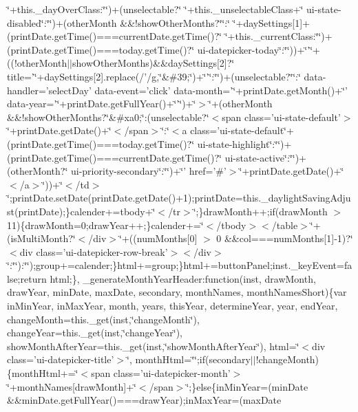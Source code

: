 {{\begin{DoxyParamCaption}
\char`\"{}+this.\+\_\+day\+Over\+Class\+:\char`\"{}\char`\"{})+(unselectable?\char`\"{} \char`\"{}+this.\+\_\+unselectable\+Class+\char`\"{} ui-\/state-\/disabled\char`\"{}\+:\char`\"{}\char`\"{})+(other\+Month \&\&!show\+Other\+Months?\char`\"{}\char`\"{}\+:\char`\"{} \char`\"{}+day\+Settings\mbox{[}1\mbox{]}+(print\+Date.\+get\+Time()===current\+Date.\+get\+Time()?\char`\"{} \char`\"{}+this.\+\_\+current\+Class\+:\char`\"{}\char`\"{})+(print\+Date.\+get\+Time()===today.\+get\+Time()?\char`\"{} ui-\/datepicker-\/today\char`\"{}\+:\char`\"{}\char`\"{}))+\char`\"{}'\char`\"{}+((!other\+Month$\vert$$\vert$show\+Other\+Months)\&\&day\+Settings\mbox{[}2\mbox{]}?\char`\"{} title='\char`\"{}+day\+Settings\mbox{[}2\mbox{]}.\+replace(/'/g,\char`\"{}\&\#39;\char`\"{})+\char`\"{}'\char`\"{}\+:\char`\"{}\char`\"{})+(unselectable?\char`\"{}\char`\"{}\+:\char`\"{} data-\/handler='select\+Day' data-\/event='click' data-\/month='\char`\"{}+print\+Date.\+get\+Month()+\char`\"{}' data-\/year='\char`\"{}+print\+Date.\+get\+Full\+Year()+\char`\"{}'\char`\"{})+\char`\"{}$>$\char`\"{}+(other\+Month \&\&!show\+Other\+Months?\char`\"{}\&\#xa0;\char`\"{}\+:(unselectable?\char`\"{}$<$span class='ui-\/state-\/default'$>$\char`\"{}+print\+Date.\+get\+Date()+\char`\"{}$<$/span$>$\char`\"{}\+:\char`\"{}$<$a class='ui-\/state-\/default\char`\"{}+(print\+Date.\+get\+Time()===today.\+get\+Time()?\char`\"{} ui-\/state-\/highlight\char`\"{}\+:\char`\"{}\char`\"{})+(print\+Date.\+get\+Time()===current\+Date.\+get\+Time()?\char`\"{} ui-\/state-\/active\char`\"{}\+:\char`\"{}\char`\"{})+(other\+Month?\char`\"{} ui-\/priority-\/secondary\char`\"{}\+:\char`\"{}\char`\"{})+\char`\"{}' href='\#'$>$\char`\"{}+print\+Date.\+get\+Date()+\char`\"{}$<$/a$>$\char`\"{}))+\char`\"{}$<$/td$>$\char`\"{};print\+Date.\+set\+Date(print\+Date.\+get\+Date()+1);print\+Date=this.\+\_\+daylight\+Saving\+Adjust(print\+Date);\}calender+=tbody+\char`\"{}$<$/tr$>$\char`\"{};\}draw\+Month++;if(draw\+Month $>$ 11)\{draw\+Month=0;draw\+Year++;\}calender+=\char`\"{}$<$/tbody$>$$<$/table$>$\char`\"{}+(is\+Multi\+Month?\char`\"{}$<$/div$>$\char`\"{}+((num\+Months\mbox{[}0\mbox{]} $>$ 0 \&\&col===num\+Months\mbox{[}1\mbox{]}-\/1)?\char`\"{}$<$div class='ui-\/datepicker-\/row-\/break'$>$$<$/div$>$\char`\"{}\+:\char`\"{}\char`\"{})\+:\char`\"{}\char`\"{});group+=calender;\}html+=group;\}html+=button\+Panel;inst.\+\_\+key\+Event=false;return html;\}, \+\_\+generate\+Month\+Year\+Header\+:function(inst, draw\+Month, draw\+Year, min\+Date, max\+Date, secondary, month\+Names, month\+Names\+Short)\{var in\+Min\+Year, in\+Max\+Year, month, years, this\+Year, determine\+Year, year, end\+Year, change\+Month=this.\+\_\+get(inst,\char`\"{}change\+Month\char`\"{}), change\+Year=this.\+\_\+get(inst,\char`\"{}change\+Year\char`\"{}), show\+Month\+After\+Year=this.\+\_\+get(inst,\char`\"{}show\+Month\+After\+Year\char`\"{}), html=\char`\"{}$<$div class='ui-\/datepicker-\/title'$>$\char`\"{}, month\+Html=\char`\"{}\char`\"{};if(secondary$\vert$$\vert$!change\+Month)\{month\+Html+=\char`\"{}$<$span class='ui-\/datepicker-\/month'$>$\char`\"{}+month\+Names\mbox{[}draw\+Month\mbox{]}+\char`\"{}$<$/span$>$\char`\"{};\}else\{in\+Min\+Year=(min\+Date \&\&min\+Date.\+get\+Full\+Year()===draw\+Year);in\+Max\+Year=(max\+Date 
\end{DoxyParamCaption}}}
